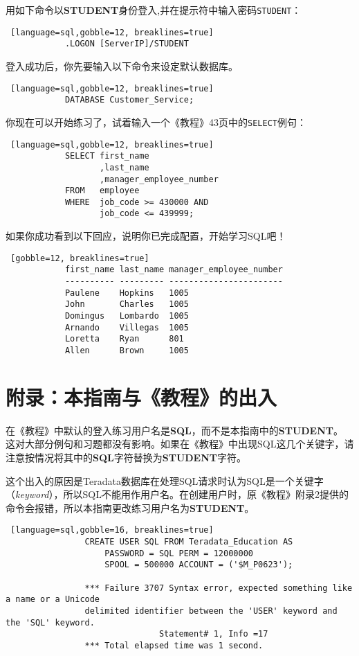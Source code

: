 \documentclass{article}
\begin{document}
		用如下命令以\textbf{STUDENT}身份登入,并在提示符中输入密码\lstinline|STUDENT|：

		\begin{lstlisting} [language=sql,gobble=12, breaklines=true]
			.LOGON [ServerIP]/STUDENT
		\end{lstlisting}

		登入成功后，你先要输入以下命令来设定默认数据库。

		\begin{lstlisting} [language=sql,gobble=12, breaklines=true]
			DATABASE Customer_Service;
		\end{lstlisting}

		你现在可以开始练习了，试着输入一个《教程》43页中的\lstinline|SELECT|例句：

		\begin{lstlisting} [language=sql,gobble=12, breaklines=true]
			SELECT first_name
			       ,last_name
			       ,manager_employee_number
			FROM   employee
			WHERE  job_code >= 430000 AND
			       job_code <= 439999;
		\end{lstlisting}

		如果你成功看到以下回应，说明你已完成配置，开始学习SQL吧！

		\begin{lstlisting} [gobble=12, breaklines=true]
			first_name last_name manager_employee_number
			---------- --------- -----------------------
			Paulene    Hopkins   1005
			John       Charles   1005
			Domingus   Lombardo  1005
			Arnando    Villegas  1005
			Loretta    Ryan      801
			Allen      Brown     1005
		\end{lstlisting}

			
		\section*{附录：本指南与《教程》的出入}

			在《教程》中默认的登入练习用户名是\textbf{SQL}，而不是本指南中的\textbf{STUDENT}。
			这对大部分例句和习题都没有影响。如果在《教程》中出现SQL这几个关键字，请注意按情况将其中的\textbf{SQL}字符替换为\textbf{STUDENT}字符。

			这个出入的原因是Teradata数据库在处理SQL请求时认为SQL是一个关键字（\textit{keyword}），所以SQL不能用作用户名。在创建用户时，原《教程》附录2提供的命令会报错，所以本指南更改练习用户名为\textbf{STUDENT}。

			\begin{lstlisting} [language=sql,gobble=16, breaklines=true]
				CREATE USER SQL FROM Teradata_Education AS
					PASSWORD = SQL PERM = 12000000
					SPOOL = 500000 ACCOUNT = ('$M_P0623');

				*** Failure 3707 Syntax error, expected something like a name or a Unicode
				delimited identifier between the 'USER' keyword and the 'SQL' keyword.
				               Statement# 1, Info =17
				*** Total elapsed time was 1 second.
			\end{lstlisting}
\end{document}
